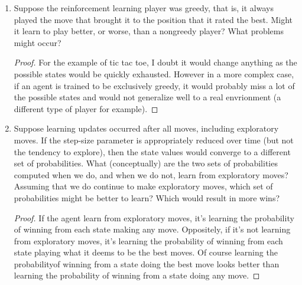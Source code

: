 \documentclass[]{book}
\theoremstyle{definition}
\begin{document}
\begin{enumerate}
\item
    Suppose the reinforcement learning player was greedy, that is, it always played the move that brought it to the position that it rated the best. Might it learn to play better, or worse, than a nongreedy player? What problems might occur?
    \begin{proof}
        For the example of tic tac toe, I doubt it would change anything as the possible states would be quickly exhausted. However in a more complex case, if an agent is trained to be exclusively greedy, it would probably miss a lot of the possible states and would not generalize well to a real envrionment (a different type of player for example).
    \end{proof}

\item
    Suppose learning updates occurred after all moves, including exploratory moves. If the step-size parameter is appropriately reduced over time (but not the tendency to explore), then the state values would converge to a different set of probabilities. What (conceptually) are the two sets of probabilities computed when we do, and when we do not, learn from exploratory moves? Assuming that we do continue to make exploratory moves, which set of probabilities might be better to learn? Which would result in more wins?
    \begin{proof}
        If the agent learn from exploratory moves, it's learning the probability of winning from each state making any move. Oppositely, if it's not learning from exploratory moves, it's learning the probability of winning from each state playing what it deems to be the best moves. Of course learning the probabilityof winning from a state doing the best move looks better than learning the probability of winning from a state doing any move.
    \end{proof}
\end{enumerate}
\end{document}
